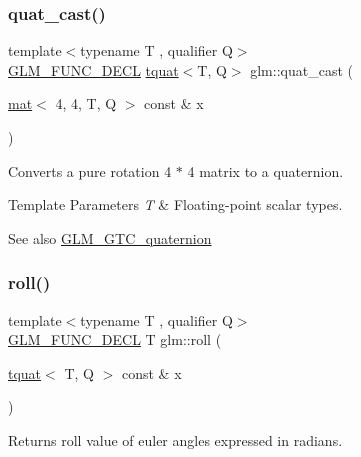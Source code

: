 \subsubsection{\texorpdfstring{quat\+\_\+cast()}{quat\_cast()}\hspace{0.1cm}{\footnotesize\ttfamily [2/2]}}
{\footnotesize\ttfamily template$<$typename T , qualifier Q$>$ \\
\mbox{\hyperlink{setup_8hpp_ab2d052de21a70539923e9bcbf6e83a51}{G\+L\+M\+\_\+\+F\+U\+N\+C\+\_\+\+D\+E\+CL}} \mbox{\hyperlink{structglm_1_1tquat}{tquat}}$<$T, Q$>$ glm\+::quat\+\_\+cast (\begin{DoxyParamCaption}\item[{\mbox{\hyperlink{structglm_1_1mat}{mat}}$<$ 4, 4, T, Q $>$ const \&}]{x }\end{DoxyParamCaption})}

Converts a pure rotation 4 $\ast$ 4 matrix to a quaternion.


\begin{DoxyTemplParams}{Template Parameters}
{\em T} & Floating-\/point scalar types.\\
\hline
\end{DoxyTemplParams}
\begin{DoxySeeAlso}{See also}
\mbox{\hyperlink{group__gtc__quaternion}{G\+L\+M\+\_\+\+G\+T\+C\+\_\+quaternion}} 
\end{DoxySeeAlso}
\mbox{\label{group__gtc__quaternion_ga3ff93afbd9cc29f2ad217f2228e8a95b}} 
\subsubsection{\texorpdfstring{roll()}{roll()}}
{\footnotesize\ttfamily template$<$typename T , qualifier Q$>$ \\
\mbox{\hyperlink{setup_8hpp_ab2d052de21a70539923e9bcbf6e83a51}{G\+L\+M\+\_\+\+F\+U\+N\+C\+\_\+\+D\+E\+CL}} T glm\+::roll (\begin{DoxyParamCaption}\item[{\mbox{\hyperlink{structglm_1_1tquat}{tquat}}$<$ T, Q $>$ const \&}]{x }\end{DoxyParamCaption})}

Returns roll value of euler angles expressed in radians.


